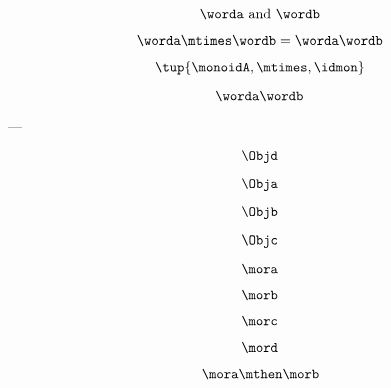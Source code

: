 {\begin{forslides}
        \begin{equation*}
            \worda \text{ and } \wordb
        \end{equation*}

        \begin{equation*}
            \label{eq:string-semigroup-wordab-2}
            \worda \mtimes  \wordb =  \worda \wordb
        \end{equation*}


        $$ \tup{ \monoidA, \mtimes, \idmon} $$


        \begin{equation*}
            \label{eq:string-semigroup-wordab-concat-2}
            \worda \wordb
        \end{equation*}

        ---

        \begin{equation}
            \label{eq:00}
            \Objd
        \end{equation}

        \begin{equation}
            \label{eq:01}
            \Obja
        \end{equation}

        \begin{equation}
            \label{eq:02}
            \Objb
        \end{equation}

        \begin{equation}
            \label{eq:03}
            \Objc
        \end{equation}

        \begin{equation}
            \label{eq:04}
            \mora
        \end{equation}

        \begin{equation}
            \label{eq:05}
            \morb
        \end{equation}

        \begin{equation}
            \label{eq:06}
            \morc
        \end{equation}

        \begin{equation}
            \label{eq:07}
            \mord
        \end{equation}

        \begin{equation}
            \label{eq:08}
            \mora \mthen \morb
        \end{equation}


\end{forslides}}
